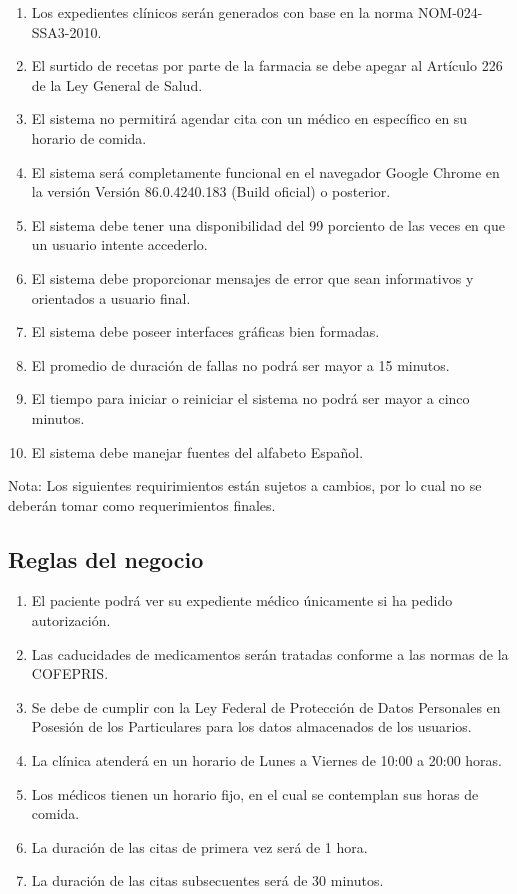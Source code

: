 \documentclass[12pt,letterpaper]{article}
\begin{document}
\begin{itemize}
\begin{enumerate}
                        \item Los expedientes clínicos serán generados con base en la norma NOM-024-SSA3-2010.
                        \item El surtido de recetas por parte de la farmacia se debe apegar al Artículo 226 de la Ley General de Salud.
                        \item El sistema no permitirá agendar cita con un médico en específico en su horario de comida.
                        \item El sistema será completamente funcional en el navegador Google Chrome en la versión Versión 86.0.4240.183 (Build oficial) o posterior.
                        \item El sistema debe tener una disponibilidad del 99 porciento de las veces en que un usuario intente accederlo.
                        \item El sistema debe proporcionar mensajes de error que sean informativos y orientados a usuario final.
                        \item El sistema debe poseer interfaces gráficas bien formadas.
                        \item El promedio de duración de fallas no podrá ser mayor a 15 minutos.
                        \item El tiempo para iniciar o reiniciar el sistema no podrá ser mayor a cinco minutos.
                        \item El sistema debe manejar fuentes del alfabeto Español.
                    \end{enumerate}
            \end{itemize}
            Nota: Los siguientes requirimientos están sujetos a cambios, por lo cual no se deberán tomar como requerimientos finales.
        \subsection{Reglas del negocio}
            \begin{enumerate}
                \item El paciente podrá ver su expediente médico únicamente si ha pedido autorización.
                \item Las caducidades de medicamentos serán tratadas conforme a las normas de la COFEPRIS.
                \item Se debe de cumplir con la Ley Federal de Protección de Datos Personales en Posesión de los Particulares para los datos almacenados de los usuarios.
                \item La clínica atenderá en un horario de Lunes a Viernes de 10:00 a 20:00 horas.
                \item Los médicos tienen un horario fijo, en el cual se contemplan sus horas de comida.
                \item La duración de las citas de primera vez será de 1 hora.
                \item La duración de las citas  subsecuentes será de 30 minutos.
            \end{enumerate}
\end{document}
